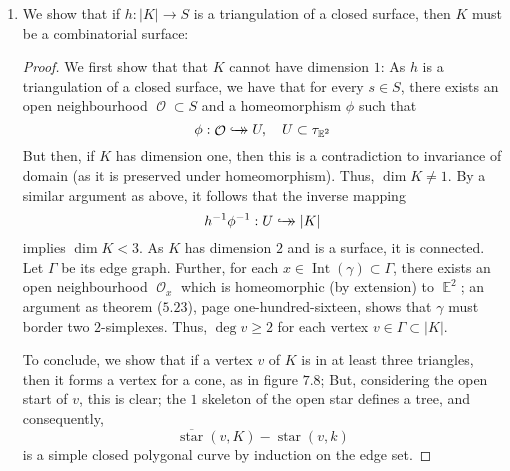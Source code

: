 \documentclass{book}
\DeclareMathOperator*{\Int}{\text{Int}}
\DeclareMathOperator*{\E}{\mathbb{E}}
\DeclareMathOperator*{\Ocal}{\mathcal{O}}
\DeclareMathOperator*{\Star}{\text{star}}
\newenvironment{Lemma}[1][Lemma]
{\proof[#1]\leftskip=1cm\rightskip=1cm}
{\endproof} %
\newcommand{\bij}{\mathrel{\hookrightarrow\hspace{-1.8ex}\to}} %
\begin{document}
\begin{enumerate}[(1)]
    \item We show that if $h: |K| \rightarrow S$ is a triangulation of a closed surface, then $K$ must be a combinatorial surface: 
        \begin{proof} We first show that that $K$ cannot have dimension $1$:
            \begin{Lemma}
                As $h$ is a triangulation of a closed surface, we have that for every $s \in S$, there exists an open neighbourhood $\Ocal \subset S$ and a homeomorphism $\phi$ such that 
                \[\phi: \Ocal \bij U, \quad U \subset \tau_{\E^2}\]
                But then, if $K$ has dimension one, then this is a contradiction to invariance of domain (as it is preserved under homeomorphism). Thus, $\dim K \neq 1$.  
            \end{Lemma}
            By a similar argument as above, it follows that the inverse mapping
            \[h^{-1}\phi^{-1}: U \bij |K|\] 
            implies $\dim K < 3$. As $K$ has dimension $2$ and is a surface, it is connected. Let $\Gamma$ be its edge graph. Further, for each $x \in \Int(\gamma) \subset \Gamma$, there exists an open neighbourhood $\Ocal_x$ which is homeomorphic (by extension) to $\E^2$; an argument as theorem ($5.23$), page one-hundred-sixteen, shows that $\gamma$ must border two $2$-simplexes. Thus, 
            $\deg v \geq 2$ for each vertex $v \in \Gamma \subset |K|$.
            \par To conclude, we show that if a vertex $v$ of $K$ is in at least three triangles, then it forms a vertex for a cone, as in figure $7.8$; But, considering the open start of $v$, this is clear; the $1$ skeleton of the open star defines a tree, and consequently, 
            \[\overline{\Star}(v, K) - \Star(v,k)\]
            is a simple closed polygonal curve by induction on the edge set. 
        \end{proof}


\end{enumerate}
\end{document}
